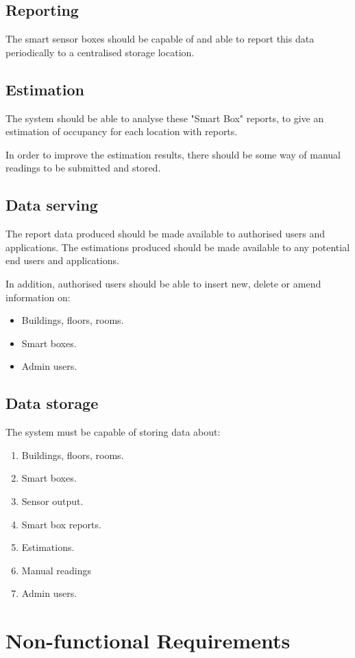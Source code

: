 \documentclass{l4proj}
\begin{document}
\subsection{Reporting}
The smart sensor boxes should be capable of and able to report this data periodically to a centralised storage location.

\subsection{Estimation}
The system should be able to analyse these "Smart Box" reports, to give an estimation of occupancy for each location with reports.

In order to improve the estimation results, there should be some way of manual readings to be submitted and stored.

\subsection{Data serving}
The report data produced should be made available to authorised users and applications.
The estimations produced should be made available to any potential end users and applications.

In addition, authorised users should be able to insert new, delete or amend information on:
\begin{itemize}  
  \item Buildings, floors, rooms.
  \item Smart boxes.
  \item Admin users.
\end{itemize}

\subsection{Data storage}
The system must be capable of storing data about: 
\begin{enumerate}
  \item Buildings, floors, rooms.
  \item Smart boxes.
  \item Sensor output.
  \item Smart box reports.
  \item Estimations.
  \item Manual readings
  \item Admin users.
\end{enumerate}

\section{Non-functional Requirements}
\end{document}
